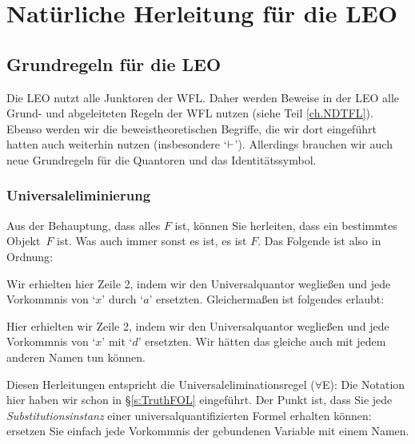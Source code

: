 \part{Natürliche Herleitung für die LEO}
\label{ch.NDFOL}

\chapter{Grundregeln für die LEO}\label{s:BasicFOL}

Die LEO nutzt alle Junktoren der WFL. Daher werden Beweise in der LEO alle Grund- und abgeleiteten Regeln der WFL nutzen (siehe Teil \ref{ch.NDTFL}). Ebenso werden wir die beweistheoretischen Begriffe, die wir dort eingeführt hatten auch weiterhin nutzen (insbesondere `$\vdash$'). Allerdings brauchen wir auch neue Grundregeln für die Quantoren und das Identitätssymbol.

\section{Universaleliminierung}

Aus der Behauptung, dass alles $F$ ist, können Sie herleiten, dass ein bestimmtes Objekt~$F$ ist. Was auch immer sonst es ist, es ist $F$. Das Folgende ist also in Ordnung:
\begin{fitchproof}
	 
\end{fitchproof}
Wir erhielten hier Zeile 2, indem wir den Universalquantor weglie{\ss}en und jede Vorkommnis von `$x$' durch `$a$' ersetzten. Gleicherma{\ss}en ist folgendes erlaubt:
\begin{fitchproof}
	 
\end{fitchproof}
Hier erhielten wir Zeile 2, indem wir den Universalquantor weglie{\ss}en und jede Vorkommnis von `$x$' mit `$d$' ersetzten. Wir hätten das gleiche auch mit jedem anderen Namen tun können. 

Diesen Herleitungen entspricht die Universaleliminationsregel ($\forall$E):
Die Notation hier haben wir schon in \S\ref{s:TruthFOL} eingeführt. Der Punkt ist, dass Sie jede \emph{Substitutionsinstanz} einer universalquantifizierten Formel erhalten können: ersetzen Sie einfach jede Vorkommnis der gebundenen Variable mit einem Namen. 

